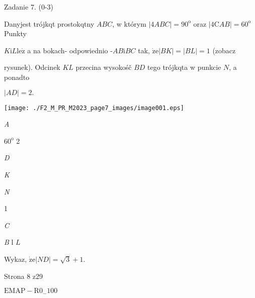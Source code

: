 \documentclass[a4paper,12pt]{article}
\begin{document}
Zadanie 7. (0-3)

Danyjest trójkqt prostokqtny $ABC$, w którym $|4ABC|=90^{\mathrm{o}}$ oraz $|4\mathrm{C}AB|=60^{\mathrm{o}}$ Punkty

$K \mathrm{i} L \mathrm{l}\mathrm{e}\dot{\mathrm{z}}$ a na bokach- odpowiednio -$AB \mathrm{i} BC$ tak, $\dot{\mathrm{z}}\mathrm{e} |BK|=|BL|=1$ (zobacz

rysunek). Odcinek $KL$ przecina wysokośč $BD$ tego trójkqta w punkcie $N$, a ponadto

$|AD|=2.$
\begin{center}
\texttt{[image: ./F2\_M\_PR\_M2023\_page7\_images/image001.eps]}
\end{center}
{\it A}

$60^{\mathrm{o}}$  2

{\it D}

{\it K}

{\it N}

1

{\it C}

{\it B} l $L$

Wykaz, $\dot{\mathrm{z}}\mathrm{e} |ND|=\sqrt{3}+1.$

Strona 8 z29

$\mathrm{E}\mathrm{M}\mathrm{A}\mathrm{P}-\mathrm{R}0_{-}100$
\end{document}
